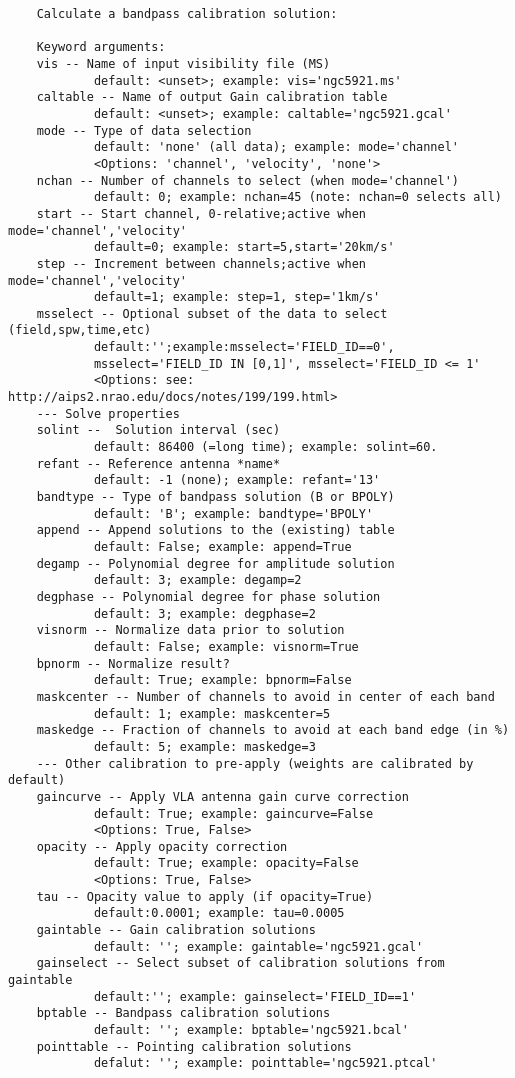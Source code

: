 \vspace{3mm}
\small
\begin{verbatim}
    Calculate a bandpass calibration solution:
    
    Keyword arguments:
    vis -- Name of input visibility file (MS)
            default: <unset>; example: vis='ngc5921.ms'
    caltable -- Name of output Gain calibration table
            default: <unset>; example: caltable='ngc5921.gcal'
    mode -- Type of data selection
            default: 'none' (all data); example: mode='channel'
            <Options: 'channel', 'velocity', 'none'>
    nchan -- Number of channels to select (when mode='channel')
            default: 0; example: nchan=45 (note: nchan=0 selects all)
    start -- Start channel, 0-relative;active when mode='channel','velocity'
            default=0; example: start=5,start='20km/s'
    step -- Increment between channels;active when mode='channel','velocity'
            default=1; example: step=1, step='1km/s'
    msselect -- Optional subset of the data to select (field,spw,time,etc)
            default:'';example:msselect='FIELD_ID==0', 
            msselect='FIELD_ID IN [0,1]', msselect='FIELD_ID <= 1'
            <Options: see: http://aips2.nrao.edu/docs/notes/199/199.html>
    --- Solve properties
    solint --  Solution interval (sec)
            default: 86400 (=long time); example: solint=60.
    refant -- Reference antenna *name*
            default: -1 (none); example: refant='13'
    bandtype -- Type of bandpass solution (B or BPOLY)
            default: 'B'; example: bandtype='BPOLY'
    append -- Append solutions to the (existing) table
            default: False; example: append=True
    degamp -- Polynomial degree for amplitude solution
            default: 3; example: degamp=2
    degphase -- Polynomial degree for phase solution
            default: 3; example: degphase=2
    visnorm -- Normalize data prior to solution
            default: False; example: visnorm=True
    bpnorm -- Normalize result?
            default: True; example: bpnorm=False
    maskcenter -- Number of channels to avoid in center of each band
            default: 1; example: maskcenter=5
    maskedge -- Fraction of channels to avoid at each band edge (in %)
            default: 5; example: maskedge=3
    --- Other calibration to pre-apply (weights are calibrated by default)
    gaincurve -- Apply VLA antenna gain curve correction
            default: True; example: gaincurve=False
            <Options: True, False>
    opacity -- Apply opacity correction
            default: True; example: opacity=False
            <Options: True, False>
    tau -- Opacity value to apply (if opacity=True)
            default:0.0001; example: tau=0.0005
    gaintable -- Gain calibration solutions
            default: ''; example: gaintable='ngc5921.gcal'
    gainselect -- Select subset of calibration solutions from gaintable
            default:''; example: gainselect='FIELD_ID==1'
    bptable -- Bandpass calibration solutions
            default: ''; example: bptable='ngc5921.bcal'
    pointtable -- Pointing calibration solutions
            defalut: ''; example: pointtable='ngc5921.ptcal'
\end{verbatim}
\normalsize

